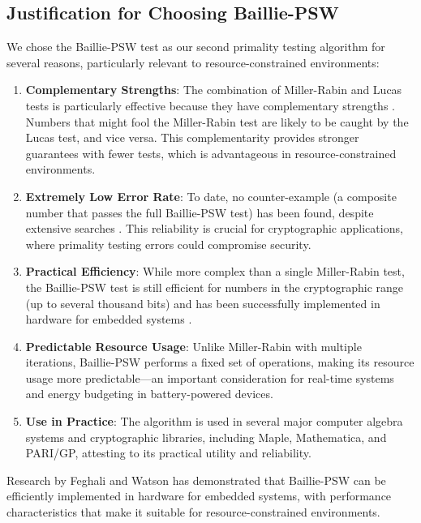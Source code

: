 \subsection{Justification for Choosing Baillie-PSW}

We chose the Baillie-PSW test as our second primality testing algorithm for several reasons, particularly relevant to resource-constrained environments:

\begin{enumerate}
    \item \textbf{Complementary Strengths}: The combination of Miller-Rabin and Lucas tests is particularly effective because they have complementary strengths \cite{taxonomy_primality}. Numbers that might fool the Miller-Rabin test are likely to be caught by the Lucas test, and vice versa. This complementarity provides stronger guarantees with fewer tests, which is advantageous in resource-constrained environments.
    
    \item \textbf{Extremely Low Error Rate}: To date, no counter-example (a composite number that passes the full Baillie-PSW test) has been found, despite extensive searches \cite{pomerance1984}. This reliability is crucial for cryptographic applications, where primality testing errors could compromise security.
    
    \item \textbf{Practical Efficiency}: While more complex than a single Miller-Rabin test, the Baillie-PSW test is still efficient for numbers in the cryptographic range (up to several thousand bits) and has been successfully implemented in hardware for embedded systems \cite{hardware_baillie}.
    
    \item \textbf{Predictable Resource Usage}: Unlike Miller-Rabin with multiple iterations, Baillie-PSW performs a fixed set of operations, making its resource usage more predictable—an important consideration for real-time systems and energy budgeting in battery-powered devices.
    
    \item \textbf{Use in Practice}: The algorithm is used in several major computer algebra systems and cryptographic libraries, including Maple, Mathematica, and PARI/GP, attesting to its practical utility and reliability.
\end{enumerate}

Research by Feghali and Watson \cite{hardware_baillie} has demonstrated that Baillie-PSW can be efficiently implemented in hardware for embedded systems, with performance characteristics that make it suitable for resource-constrained environments.

